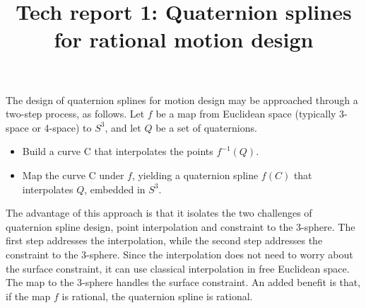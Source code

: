 \documentclass[11pt]{article}
\title{Tech report 1: Quaternion splines for rational motion design}
\begin{document}
\maketitle

% 
%

The design of quaternion splines for motion design may be approached through
a two-step process, as follows.
Let $f$ be a map from Euclidean space (typically 3-space or 4-space) to $S^3$,
and let $Q$ be a set of quaternions.

\begin{itemize}
\item Build a curve C that interpolates the points $f^{-1}(Q)$.
\item Map the curve C under $f$, yielding a quaternion spline $f(C)$ 
      that interpolates $Q$, embedded in $S^3$.
\end{itemize}

The advantage of this approach is that it isolates the two challenges
of quaternion spline design, point interpolation and constraint to the 3-sphere.
The first step addresses the interpolation, while the second step addresses the constraint
to the 3-sphere.
Since the interpolation does not need to worry about the surface constraint, it can use
classical interpolation in free Euclidean space.
The map to the 3-sphere handles the surface constraint.
An added benefit is that, if the map $f$ is rational, the quaternion spline is rational.
\end{document}
